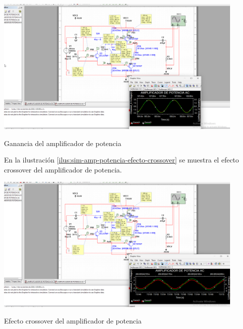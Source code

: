 \begin{ilustracion}[ht]
    \centering
    \includegraphics[width=0.9\textwidth]{src/images/p1/p1-sim-ganancia.png}
    \caption{Ganancia del amplificador de potencia}
    \label{ilus:sim-amp-potencia-ganancia}
\end{ilustracion}

En la ilustración \ref{ilus:sim-amp-potencia-efecto-crossover} se muestra el efecto crossover del amplificador de potencia. 

\begin{ilustracion}[ht]
    \centering
    \includegraphics[width=0.9\textwidth]{src/images/p1/p1-sim-efecto-crossover.png}
    \caption{Efecto crossover del amplificador de potencia}
    \label{ilus:sim-amp-potencia-efecto-crossover}
\end{ilustracion}
